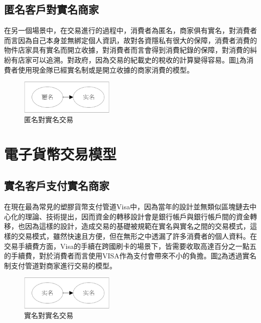 
		\subsection{匿名客戶對實名商家}
		在另一個場景中，在交易進行的過程中，消費者為匿名，商家俱有實名，對消費者而言因為自己本身並無綁定個人資訊，故對各資隱私有很大的保障，消費者消費的物件店家具有實名而開立收據，對消費者而言會得到消費紀錄的保障，對消費的糾紛有店家可以追溯。對政府，因為交易的紀載史的稅收的計算變得容易。圖\ref{modean}為消費者使用現金隊已經實名制或是開立收據的商家消費的模型。

		\begin{figure}[h]
			\centering
			\includegraphics[width = 0.4\textwidth]{modean.png}
			\caption{匿名對實名交易}\label{modean}
		\end{figure}


	\section{電子貨幣交易模型}
		\subsection{實名客戶支付實名商家}
		在現在最為常見的塑膠貨幣支付管道Visa中，因為當年的設計並無類似區塊鏈去中心化的理論、技術提出，因而資金的轉移設計會是銀行帳戶與銀行帳戶間的資金轉移，也因為這樣的設計，造成交易的基礎被規範在實名與實名之間的交易模式，這樣的交易模式，雖然快速且方便，但在無形之中透漏了許多消費者的個人資料。在交易手續費方面，Visa的手續在跨國刷卡的場景下，皆需要收取高達百分之一點五的手續費，對於消費者而言使用VISA作為支付會帶來不小的負擔。圖\ref{modenn}為透過實名制支付管道對商家進行交易的模型。

		\begin{figure}[h]
			\centering
			\includegraphics[width = 0.4\textwidth]{modenn.png}
			\caption{實名對實名交易}\label{modenn}
		\end{figure}

